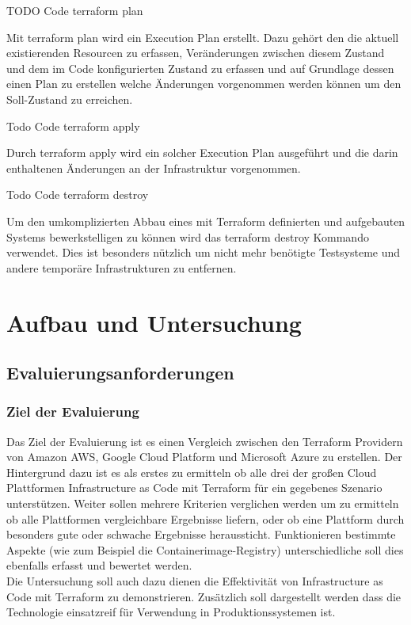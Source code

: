 \begin{spacing}{1.2}
TODO Code terraform plan

Mit terraform plan wird ein Execution Plan erstellt. Dazu gehört den die
aktuell existierenden Resourcen zu erfassen, Veränderungen zwischen
diesem Zustand und dem im Code konfigurierten Zustand zu erfassen und
auf Grundlage dessen einen Plan zu erstellen welche Änderungen vorgenommen
werden können um den Soll-Zustand zu erreichen.

Todo Code terraform apply

Durch terraform apply wird ein solcher Execution Plan ausgeführt und die darin
enthaltenen Änderungen an der Infrastruktur vorgenommen.

Todo Code terraform destroy

Um den umkomplizierten Abbau eines mit Terraform definierten und aufgebauten
Systems bewerkstelligen zu können wird das terraform destroy Kommando
verwendet. Dies ist besonders nützlich um nicht mehr benötigte Testsysteme
und andere temporäre Infrastrukturen zu entfernen.

\chapter{Aufbau und Untersuchung}
\label{sec:real}

\section{Evaluierungsanforderungen}

\subsection{Ziel der Evaluierung}

Das Ziel der Evaluierung ist es einen Vergleich zwischen den Terraform
Providern von Amazon AWS, Google Cloud Platform und Microsoft Azure zu
erstellen. Der Hintergrund dazu ist es als erstes zu ermitteln ob alle
drei der großen Cloud Plattformen Infrastructure as Code mit Terraform
für ein gegebenes Szenario unterstützen. Weiter sollen mehrere
Kriterien verglichen werden um zu ermitteln ob alle Plattformen
vergleichbare Ergebnisse liefern, oder ob eine Plattform durch besonders
gute oder schwache Ergebnisse heraussticht. Funktionieren bestimmte
Aspekte (wie zum Beispiel die Containerimage-Registry) unterschiedliche
soll dies ebenfalls erfasst und bewertet werden.\\
Die Untersuchung soll auch dazu dienen die Effektivität von
Infrastructure as Code mit Terraform zu demonstrieren. Zusätzlich soll
dargestellt werden dass die Technologie einsatzreif für Verwendung in
Produktionssystemen ist.


\end{spacing}
